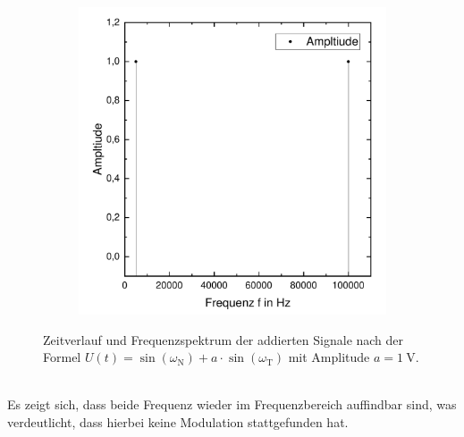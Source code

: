 \documentclass[a4paper,twoside,final]{article}
\begin{document}
\begin{figure}[htp]
\begin{subfigure}{0.45\textwidth}
        \includegraphics[width=\textwidth]{Bilder/Addition_Frequenzverlauf.pdf}
    \end{subfigure}
    \label{fig:Addition}
    \caption{Zeitverlauf und Frequenzspektrum der addierten Signale nach der Formel $U(t) = \sin(\omega_\text{N}) + a\cdot \sin(\omega_\text{T})$ mit Amplitude $a = \SI{1}{\volt}$.}
\end{figure}\\
Es zeigt sich, dass beide Frequenz wieder im Frequenzbereich auffindbar sind, was verdeutlicht, dass hierbei keine Modulation stattgefunden hat.
\end{document}
